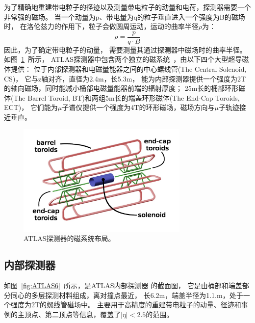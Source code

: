 为了精确地重建带电粒子的径迹以及测量带电粒子的动量和电荷，探测器需要一个非常强的磁场。
当一个动量为p、带电量为q的粒子垂直进入一个强度为B的磁场时，
在洛伦兹力的作用下，粒子会做圆周运动，运动的曲率半径$\rho$为：
\begin{equation} 
\label{eq:rhodef}
\rho=\frac{p}{q\cdot B}
\end{equation}
因此，为了确定带电粒子的动量，
需要测量其通过探测器中磁场时的曲率半径。
如图~\ref{fig:ATLAS5}~所示，
ATLAS探测器中包含两个独立的磁系统~\cite{ATLASMS}，由以下四个大型超导磁体提供：
位于内部探测器和电磁量能器之间的中心螺线管(The Central Solenoid, CS)，
它与z轴对齐，直径为2.4m，长5.3m，
能为内部探测器提供一个强度为2T的轴向磁场，同时能减小桶部电磁量能器前端的辐射厚度；
25m长的桶部环形磁体(The Barrel Toroid, BT)和两组5m长的端盖环形磁体(The End-Cap Toroids, ECT)，
它们能为$\mu$子谱仪提供一个强度为4T的环形磁场，磁场方向与$\mu$子轨迹接近垂直。

\begin{figure}
  \begin{center}
    \includegraphics[width=0.75\textwidth]{figuresEXP/ATLAS5.jpg}
  \end{center}
  \caption{
 ATLAS探测器的磁系统布局。
  }
    \label{fig:ATLAS5}
\end{figure}

\subsection{内部探测器}
\label{sec:ATLASID}

如图~\ref{fig:ATLAS6}~所示，是ATLAS内部探测器
的截面图，
它是由桶部和端盖部分同心的多层探测材料组成，离对撞点最近，
长6.2m，端盖半径为1.1.m，处于一个强度为2T的螺线管磁场中。
主要用于高精度的重建带电粒子的动量、径迹和事例的主顶点、第二顶点等信息，覆盖了$|\eta|<2.5$的范围。

